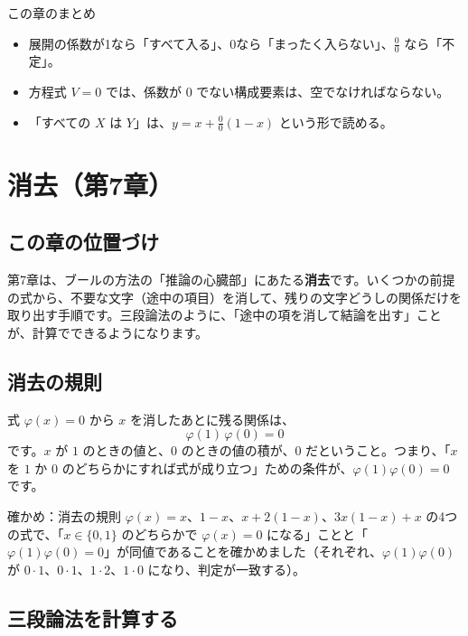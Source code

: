 \documentclass[a4paper,11pt,openany]{ltjsbook}
\begin{document}
\begin{pointbox}{この章のまとめ}
\begin{itemize}[leftmargin=*]
\item 展開の係数が1なら「すべて入る」、0なら「まったく入らない」、$\tfrac00$ なら「不定」。
\item 方程式 $V=0$ では、係数が $0$ でない構成要素は、空でなければならない。
\item 「すべての $X$ は $Y$」は、$y=x+\tfrac00(1-x)$ という形で読める。
\end{itemize}
\end{pointbox}

\chapter{消去（第7章）}

\section{この章の位置づけ}

第7章は、ブールの方法の「推論の心臓部」にあたる\textbf{消去}です。いくつかの前提の式から、不要な文字（途中の項目）を消して、残りの文字どうしの関係だけを取り出す手順です。三段論法のように、「途中の項を消して結論を出す」ことが、計算でできるようになります。

\section{消去の規則}

式 $\varphi(x)=0$ から $x$ を消したあとに残る関係は、
\[
\varphi(1)\,\varphi(0)=0
\]
です。$x$ が $1$ のときの値と、$0$ のときの値の積が、$0$ だということ。つまり、「$x$ を $1$ か $0$ のどちらかにすれば式が成り立つ」ための条件が、$\varphi(1)\varphi(0)=0$ です。

\begin{examplebox}{確かめ：消去の規則}
$\varphi(x)=x$、$1-x$、$x+2(1-x)$、$3x(1-x)+x$ の4つの式で、「$x\in\{0,1\}$ のどちらかで $\varphi(x)=0$ になる」ことと「$\varphi(1)\varphi(0)=0$」が同値であることを確かめました（それぞれ、$\varphi(1)\varphi(0)$ が $0\cdot1$、$0\cdot1$、$1\cdot2$、$1\cdot0$ になり、判定が一致する）。
\end{examplebox}

\section{三段論法を計算する}
\end{document}
